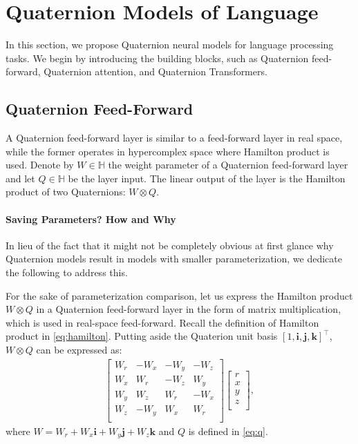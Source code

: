\documentclass[11pt,a4paper]{article}
\def \bi {\mathbf{i}}
\def \bj {\mathbf{j}}
\def \bk {\mathbf{k}}
\begin{document}
\section{Quaternion Models of Language}
In this section, we propose Quaternion neural models for language processing tasks. We begin by introducing the building blocks, such as Quaternion feed-forward, Quaternion attention, and Quaternion Transformers.

\subsection{Quaternion Feed-Forward}

A Quaternion feed-forward layer is similar to a feed-forward layer in real space, while the former operates in  hypercomplex space where Hamilton product is used. Denote by $W \in \mathbb{H}$ the weight parameter of a Quaternion feed-forward layer and let $Q \in \mathbb{H}$ be the layer input. The linear output of the layer is the Hamilton product of two Quaternions: $W \otimes Q$.


\paragraph{Saving Parameters? How and Why}

In lieu of the fact that it might not be completely obvious at first glance why Quaternion models result in models with smaller parameterization, we dedicate the following to address this.

For the sake of parameterization comparison, let us express the Hamilton product $W \otimes Q$ in a Quaternion feed-forward layer in the form of matrix multiplication, which is used in real-space feed-forward. Recall the definition of Hamilton product in \eqref{eq:hamilton}. Putting aside the Quaterion unit basis $[1, \bi, \bj, \bk]^\top$, $W \otimes Q$ can be expressed as:
\begin{align}
\label{eq:saving}
\begin{bmatrix}
    W_r & -W_x & -W_y & -W_z \\
    W_x & W_r & -W_z & W_y \\
    W_y & W_z & W_r & -W_x \\
    W_z & -W_y & W_x & W_r \\
\end{bmatrix}
\begin{bmatrix}
    r \\
    x\\
    y\\
    z \\
\end{bmatrix},
\end{align}
where $W = W_r + W_x\bi + W_y\bj + W_z\bk$ and $Q$ is defined in \eqref{eq:q}.
\end{document}
